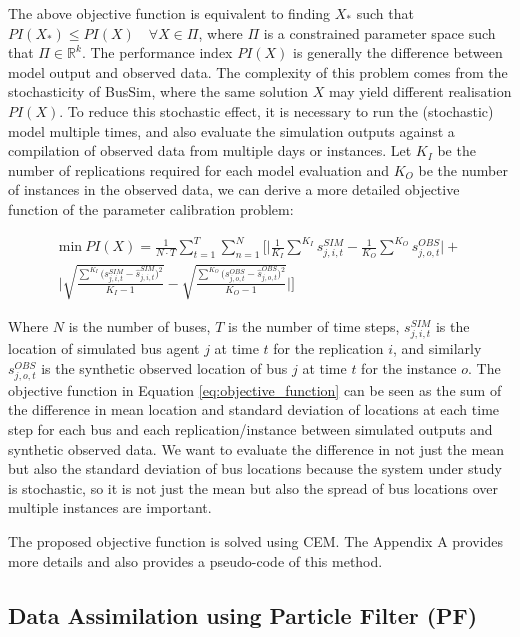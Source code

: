 \documentclass[11pt]{article}
\begin{document}
The above objective function is equivalent to finding $X_*$ such that $PI(X_*) \leq PI(X) \quad \forall X \in \Pi$, where $\Pi$ is a constrained parameter space such that $\Pi \in \mathbb{R}^k$. The performance index $PI(X)$ is generally the difference between model output and observed data. The complexity of this problem comes from the stochasticity of BusSim, where the same solution $X$ may yield different realisation $PI(X)$. To reduce this stochastic effect, it is necessary to run the (stochastic) model multiple times, and also evaluate the simulation outputs against a compilation of observed data from multiple days or instances. Let $K_I$ be the number of replications required for each model evaluation and $K_O$ be the number of instances in the observed data, we can derive a more detailed objective function of the parameter calibration problem: 

\begin{align}
    \text{min} \ PI(X) = \frac{1}{N \cdot T} \sum_{t=1}^T \sum_{n=1}^N \Bigg[ \bigg|  \frac{1}{K_I} \sum^{K_I}  s_{j,i,t}^{SIM}  - \frac{1}{K_O} \sum^{K_O}  s_{j,o,t}^{OBS} \bigg| + \nonumber \\
    \bigg| \sqrt{\frac{\sum^{K_I} \big( s_{j,i,t}^{SIM} - \hat{s}_{j,i,t}^{SIM} \big)^2}{K_I-1}}  - \sqrt{\frac{\sum^{K_O} \big( s_{j,o,t}^{OBS} - \hat{s}_{j,o,t}^{OBS} \big)^2}{K_O-1}} \bigg|   \Bigg]
    \label{eq:objective_function}
\end{align}

Where $N$ is the number of buses, $T$ is the number of time steps, $s_{j,i,t}^{SIM}$ is the location of simulated bus agent $j$ at time $t$ for the replication $i$, and similarly $s_{j,o,t}^{OBS}$ is the synthetic observed location of bus $j$ at time $t$ for the instance $o$. The objective function in Equation \ref{eq:objective_function} can be seen as the sum of the difference in mean location and standard deviation of locations at each time step for each bus and each replication/instance between simulated outputs and synthetic observed data. We want to evaluate the difference in not just the mean but also the standard deviation of bus locations because the system under study is stochastic, so it is not just the mean but also the spread of bus locations over multiple instances are important. 

The proposed objective function is solved using CEM. The Appendix A provides more details and also provides a pseudo-code of this method. 

\subsection{Data Assimilation using Particle Filter (PF)}
\end{document}

